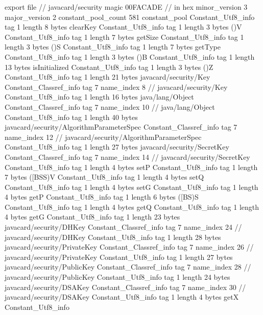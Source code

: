 export file {		// javacard/security
	magic	00FACADE		 // in hex
	minor_version	3
	major_version	2
	constant_pool_count	581
	constant_pool {
		Constant_Utf8_info {
			tag	1
			length	8
			bytes	clearKey
		}
		Constant_Utf8_info {
			tag	1
			length	3
			bytes	()V
		}
		Constant_Utf8_info {
			tag	1
			length	7
			bytes	getSize
		}
		Constant_Utf8_info {
			tag	1
			length	3
			bytes	()S
		}
		Constant_Utf8_info {
			tag	1
			length	7
			bytes	getType
		}
		Constant_Utf8_info {
			tag	1
			length	3
			bytes	()B
		}
		Constant_Utf8_info {
			tag	1
			length	13
			bytes	isInitialized
		}
		Constant_Utf8_info {
			tag	1
			length	3
			bytes	()Z
		}
		Constant_Utf8_info {
			tag	1
			length	21
			bytes	javacard/security/Key
		}
		Constant_Classref_info {
			tag	7
			name_index	8		// javacard/security/Key
		}
		Constant_Utf8_info {
			tag	1
			length	16
			bytes	java/lang/Object
		}
		Constant_Classref_info {
			tag	7
			name_index	10		// java/lang/Object
		}
		Constant_Utf8_info {
			tag	1
			length	40
			bytes	javacard/security/AlgorithmParameterSpec
		}
		Constant_Classref_info {
			tag	7
			name_index	12		// javacard/security/AlgorithmParameterSpec
		}
		Constant_Utf8_info {
			tag	1
			length	27
			bytes	javacard/security/SecretKey
		}
		Constant_Classref_info {
			tag	7
			name_index	14		// javacard/security/SecretKey
		}
		Constant_Utf8_info {
			tag	1
			length	4
			bytes	setP
		}
		Constant_Utf8_info {
			tag	1
			length	7
			bytes	([BSS)V
		}
		Constant_Utf8_info {
			tag	1
			length	4
			bytes	setQ
		}
		Constant_Utf8_info {
			tag	1
			length	4
			bytes	setG
		}
		Constant_Utf8_info {
			tag	1
			length	4
			bytes	getP
		}
		Constant_Utf8_info {
			tag	1
			length	6
			bytes	([BS)S
		}
		Constant_Utf8_info {
			tag	1
			length	4
			bytes	getQ
		}
		Constant_Utf8_info {
			tag	1
			length	4
			bytes	getG
		}
		Constant_Utf8_info {
			tag	1
			length	23
			bytes	javacard/security/DHKey
		}
		Constant_Classref_info {
			tag	7
			name_index	24		// javacard/security/DHKey
		}
		Constant_Utf8_info {
			tag	1
			length	28
			bytes	javacard/security/PrivateKey
		}
		Constant_Classref_info {
			tag	7
			name_index	26		// javacard/security/PrivateKey
		}
		Constant_Utf8_info {
			tag	1
			length	27
			bytes	javacard/security/PublicKey
		}
		Constant_Classref_info {
			tag	7
			name_index	28		// javacard/security/PublicKey
		}
		Constant_Utf8_info {
			tag	1
			length	24
			bytes	javacard/security/DSAKey
		}
		Constant_Classref_info {
			tag	7
			name_index	30		// javacard/security/DSAKey
		}
		Constant_Utf8_info {
			tag	1
			length	4
			bytes	getX
		}
		Constant_Utf8_info {
}}}
